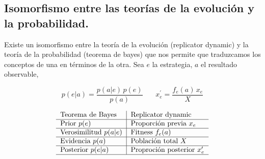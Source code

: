 \documentclass[a4paper,10pt]{article}
\begin{document}
\subsection{Isomorfismo entre las teorías de la evolución y la probabilidad.}

Existe un isomorfismo entre la teoría de la evolución (replicator dynamic) y la teoría de la probabilidad (teorema de bayes) que nos permite que traduzcamos los conceptos de una en términos de la otra.
Sea $e$ la estrategia, $a$ el resultado observable, 

\begin{equation} 
 p(e|a) = \frac{p(a|e)\,p(e)}{p(a)}   \ \ \ \ \ \ \ \   x_e^\prime = \frac{f_e(a)\,x_e}{X}  
\end{equation}

\begin{align*}
\centering
 \begin{tabular}{l|l}
  Teorema de Bayes & Replicator dynamic  \\ \hline
  Prior $p(e)$ & Proporción previa $x_e$ \\ \hline
  Verosimilitud $p(a|e)$ & Fitness $f_e(a)$ \\ \hline
  Evidencia $p(a)$ & Población total $X$ \\ \hline
  Posterior $p(e|a)$ & Proproción posterior $x_e^\prime$ \\ \hline
 \end{tabular}
\end{align*}
\end{document}
